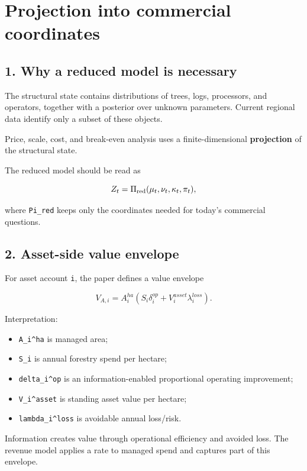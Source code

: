 \section{Projection into commercial coordinates}\label{projection-into-commercial-coordinates}

\subsection{1. Why a reduced model is necessary}\label{why-a-reduced-model-is-necessary}

The structural state contains distributions of trees, logs, processors, and
operators, together with a posterior over unknown parameters. Current regional
data identify only a subset of these objects.

Price, scale, cost, and break-even analysis uses a finite-dimensional
\textbf{projection} of the structural state.

The reduced model should be read as

\[
Z_t=\Pi_{\rm red}(\mu_t,\nu_t,\kappa_t,\pi_t),
\]

where \texttt{Pi\_red} keeps only the coordinates needed for today's commercial
questions.

\subsection{2. Asset-side value envelope}\label{asset-side-value-envelope}

For asset account \texttt{i}, the paper defines a value envelope

\[
V_{A,i}=A_i^{ha}\left(S_i\delta_i^{op}
+V_i^{asset}\lambda_i^{loss}\right).
\]

Interpretation:

\begin{itemize}
\tightlist
\item
  \texttt{A\_i\^{}ha} is managed area;
\item
  \texttt{S\_i} is annual forestry spend per hectare;
\item
  \texttt{delta\_i\^{}op} is an information-enabled proportional operating improvement;
\item
  \texttt{V\_i\^{}asset} is standing asset value per hectare;
\item
  \texttt{lambda\_i\^{}loss} is avoidable annual loss/risk.
\end{itemize}

Information creates value through operational efficiency and avoided loss. The
revenue model applies a rate to managed spend and captures part of this envelope.

